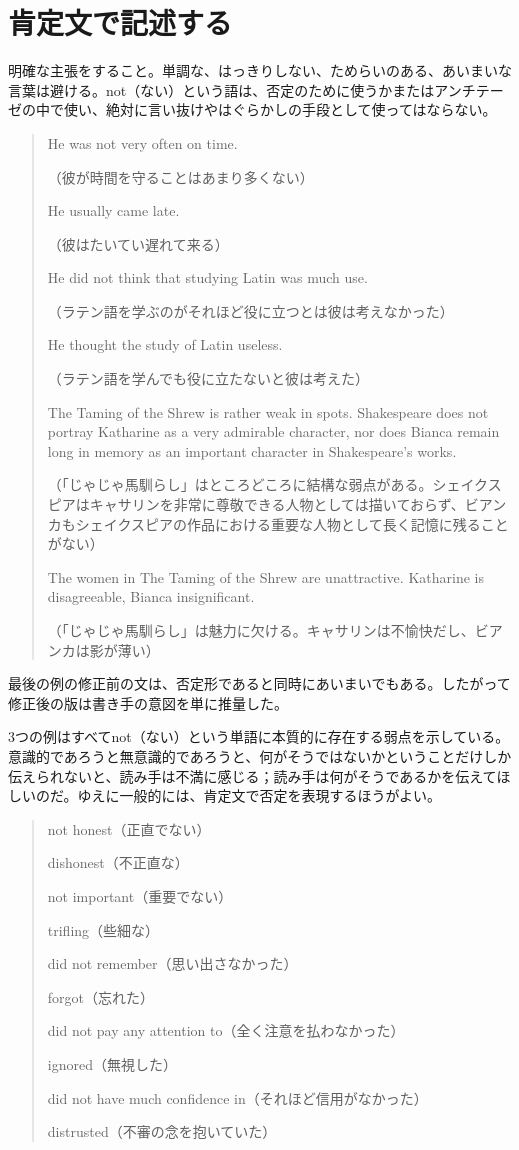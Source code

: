 \section{肯定文で記述する}
明確な主張をすること。単調な、はっきりしない、ためらいのある、あいまいな言葉は避ける。not（ない）という語は、否定のために使うかまたはアンチテーゼの中で使い、絶対に言い抜けやはぐらかしの手段として使ってはならない。
\begin{quote}
    He was not very often on time.
    
    （彼が時間を守ることはあまり多くない）
    
    He usually came late.
    
    （彼はたいてい遅れて来る）
    
    He did not think that studying Latin was much use.
    
    （ラテン語を学ぶのがそれほど役に立つとは彼は考えなかった）
    
    He thought the study of Latin useless.
    
    （ラテン語を学んでも役に立たないと彼は考えた）
    
    The Taming of the Shrew is rather weak in spots. Shakespeare does
not portray Katharine as a very admirable character, nor does Bianca
remain long in memory as an important character in Shakespeare's works.

（「じゃじゃ馬馴らし」はところどころに結構な弱点がある。シェイクスピアはキャサリンを非常に尊敬できる人物としては描いておらず、ビアンカもシェイクスピアの作品における重要な人物として長く記憶に残ることがない）

The women in The Taming of the Shrew are unattractive. Katharine
is disagreeable, Bianca insignificant.

（「じゃじゃ馬馴らし」は魅力に欠ける。キャサリンは不愉快だし、ビアンカは影が薄い）
\end{quote}
最後の例の修正前の文は、否定形であると同時にあいまいでもある。したがって修正後の版は書き手の意図を単に推量した。
\par
3つの例はすべてnot（ない）という単語に本質的に存在する弱点を示している。意識的であろうと無意識的であろうと、何がそうではないかということだけしか伝えられないと、読み手は不満に感じる；読み手は何がそうであるかを伝えてほしいのだ。ゆえに一般的には、肯定文で否定を表現するほうがよい。
\begin{quote}
    not honest（正直でない）
    
    dishonest（不正直な）
    
    not important（重要でない）
    
    trifling（些細な）
    
    did not remember（思い出さなかった）
    
    forgot（忘れた）
    
    did not pay any attention to（全く注意を払わなかった）
    
    ignored（無視した）
    
    did not have much confidence in（それほど信用がなかった）
    
    distrusted（不審の念を抱いていた）
\end{quote}
